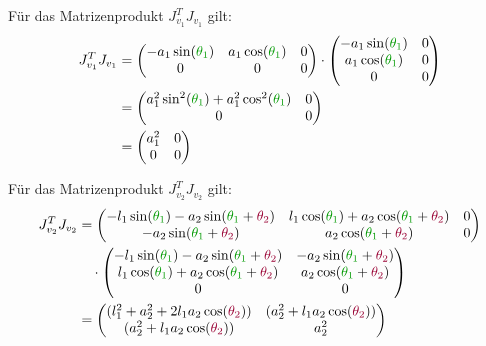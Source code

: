 \documentclass[a4paper, 12pt]{scrartcl}
\newcommand{\gruen}[2][gruen]{\textcolor{#1}{#2}}
\newcommand{\dunkelrot}[2][dunkelrot]{\textcolor{#1}{#2}}
\begin{document}
Für das Matrizenprodukt $J_{v_1}^T J_{v_1}$ gilt:
\begin{align*}
    J_{v_1}^T J_{v_1} 
    &=
    \begin{pmatrix}
        -a_1 \sin(\gruen{\theta_1}) & a_1 \cos(\gruen{\theta_1}) & 0 \\
        0 & 0 & 0
    \end{pmatrix}
    \cdot
    \begin{pmatrix}
        -a_1 \sin(\gruen{\theta_1}) & 0 \\
        a_1 \cos(\gruen{\theta_1}) & 0 \\
        0 & 0
    \end{pmatrix}
    \\
    &=
    \begin{pmatrix}
        a_1^2 \sin^2(\gruen{\theta_1}) + a_1^2 \cos^2(\gruen{\theta_1}) & 0 \\
        0 & 0
    \end{pmatrix}
    \\
    &=
    \begin{pmatrix}
        a_1^2 & 0 \\
        0 & 0
    \end{pmatrix}
\end{align*}

Für das Matrizenprodukt $J_{v_2}^T J_{v_2}$ gilt:
\begin{align*}
    J_{v_2}^T J_{v_2} 
    &=
    \begin{pmatrix}
        -l_1 \sin(\gruen{\theta_1}) - a_2 \sin(\gruen{\theta_1} + \dunkelrot{\theta_2}) 
        & l_1 \cos(\gruen{\theta_1}) + a_2 \cos(\gruen{\theta_1} + \dunkelrot{\theta_2}) 
        & 0 \\
        -a_2 \sin(\gruen{\theta_1} + \dunkelrot{\theta_2}) 
        & a_2 \cos(\gruen{\theta_1} + \dunkelrot{\theta_2})
        & 0
    \end{pmatrix}
    \\
    &\quad \cdot
    \begin{pmatrix}
        -l_1 \sin(\gruen{\theta_1}) - a_2 \sin(\gruen{\theta_1} + \dunkelrot{\theta_2}) 
        & -a_2 \sin(\gruen{\theta_1} + \dunkelrot{\theta_2}) \\
        l_1 \cos(\gruen{\theta_1}) + a_2 \cos(\gruen{\theta_1} + \dunkelrot{\theta_2}) 
        & a_2 \cos(\gruen{\theta_1} + \dunkelrot{\theta_2}) \\
        0 & 0
    \end{pmatrix}
    \\
    &=
    \begin{pmatrix}
        (l_1^2 + a_2^2 + 2 l_1 a_2  \cos(\dunkelrot{\theta_{2}})) 
        & (a_2^2 + l_1 a_2  \cos(\dunkelrot{\theta_{2}})) \\
        (a_2^2 + l_1 a_2  \cos(\dunkelrot{\theta_{2}})) 
        & a_2^2
    \end{pmatrix}
\end{align*}
\end{document}
